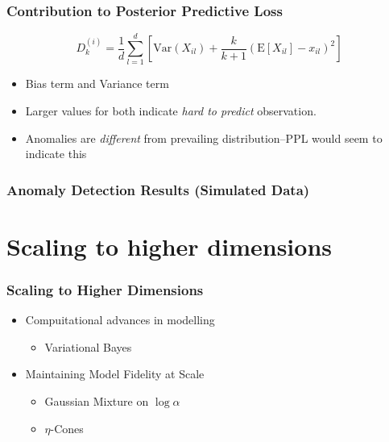 \documentclass[aspectratio=169]{beamer}
\begin{document}
\begin{frame}
    \frametitle{Contribution to Posterior Predictive Loss}
    \begin{equation*}
         D_k^{(i)} = \frac{1}{d}\sum_{l = 1}^{d}\left[\text{Var}(X_{il}) +
                        \frac{k}{k+1}\left(\text{E}[X_{il}] - x_{il}\right)^2\right]
    \end{equation*}
    \begin{itemize}
        \item Bias term and Variance term
        \item Larger values for both indicate \emph{hard to predict} observation.
        \item Anomalies are \emph{different} from prevailing distribution--PPL would seem to indicate this
    \end{itemize}
\end{frame}

\begin{frame}
  \frametitle{Anomaly Detection Results (Simulated Data)}
  \begin{center}
    
  \end{center}
\end{frame}

\section[Scaling]{Scaling to higher dimensions}

\begin{frame}
  \frametitle{Scaling to Higher Dimensions}
  \begin{itemize}
    \item Compuitational advances in modelling
      \begin{itemize}
        \item Variational Bayes
      \end{itemize}
    \item Maintaining Model Fidelity at Scale
      \begin{itemize}
        \item Gaussian Mixture on $\log\alpha$
        \item $\eta$-Cones
      \end{itemize}
  \end{itemize}
\end{frame}
\end{document}
